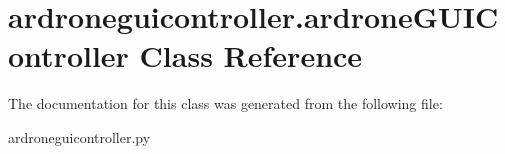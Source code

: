 \hypertarget{classardroneguicontroller_1_1ardroneGUIController}{\section{ardroneguicontroller.\-ardrone\-G\-U\-I\-Controller Class Reference}
\label{classardroneguicontroller_1_1ardroneGUIController}
}


The documentation for this class was generated from the following file\-:\begin{DoxyCompactItemize}
\item 
ardroneguicontroller.\-py\end{DoxyCompactItemize}
